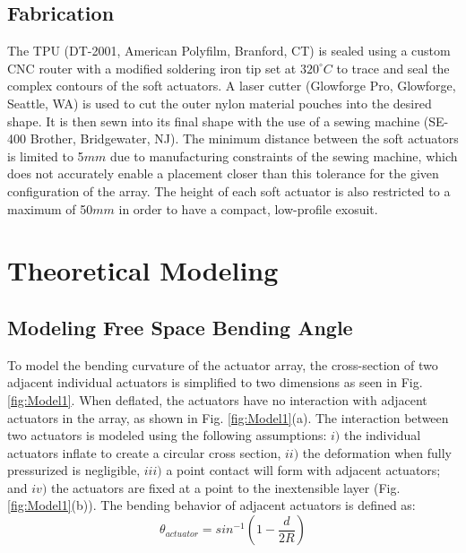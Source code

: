 \documentclass[letterpaper, 10 pt, conference]{ieeeconf}  %
\begin{document}
 \subsection{Fabrication}
The TPU  (DT-2001, American Polyfilm, Branford, CT) is sealed using a custom CNC router with a modified soldering iron tip set at $320^{\circ} C$ to trace and seal the complex contours of the soft actuators. A laser cutter (Glowforge Pro, Glowforge, Seattle, WA) is used to cut the outer nylon material pouches into the desired shape. It is then sewn into its final shape with the use of a sewing machine (SE-400 Brother, Bridgewater, NJ). The minimum distance between the soft actuators is limited to 5$mm$ due to manufacturing constraints of the sewing machine, which does not accurately enable a placement closer than this tolerance for the given configuration of the array. The height of each soft actuator is also restricted to a maximum of 50$mm$ in order to have a compact, low-profile exosuit.   
 

\section{Theoretical Modeling}

\subsection{Modeling Free Space Bending Angle}

To model the bending curvature of the actuator array, the cross-section of two adjacent individual actuators is simplified to two dimensions as seen in Fig. \ref{fig:Model1}. When deflated, the actuators have no interaction with adjacent actuators in the array, as shown in Fig. \ref{fig:Model1}(a). The interaction between two actuators is modeled using the following assumptions:  $i)$ the individual actuators inflate to create a circular cross section, $ii)$ the deformation when fully pressurized is negligible, $iii)$ a point contact will form with adjacent actuators; and $iv)$ the actuators are fixed at a point to the inextensible layer (Fig. \ref{fig:Model1}(b)). The bending behavior of adjacent actuators is defined as: 
\begin{equation}\label{eq. sin}
	\theta_{actuator}=sin^{-1}(1-\frac{d}{2R}) 
\end{equation}
\end{document}
